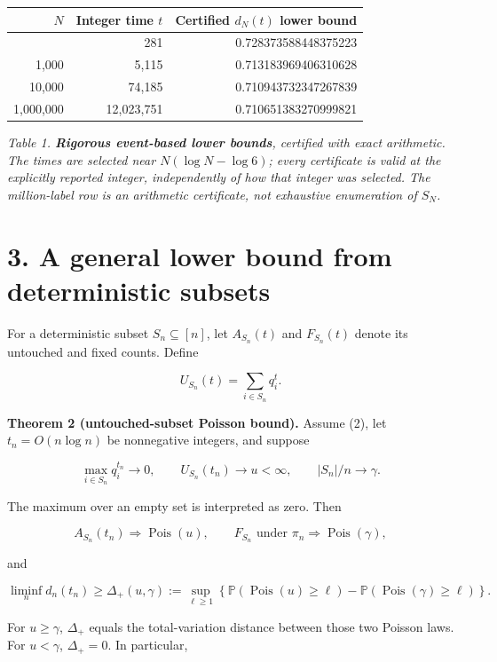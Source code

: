 \documentclass[
  british,
  11pt,
]{article}
\newcounter{none} %
\begin{document}
{\def\LTcaptype{none} %
\begin{longtable}[]{@{}rrr@{}}
\toprule\noalign{}
\(N\) & Integer time \(t\) & Certified \(d_N(t)\) lower bound \\
\midrule\noalign{}
\endhead
\bottomrule\noalign{}
\endlastfoot
100 & 281 & 0.728373588448375223 \\
1,000 & 5,115 & 0.713183969406310628 \\
10,000 & 74,185 & 0.710943732347267839 \\
1,000,000 & 12,023,751 & 0.710651383270999821 \\
\end{longtable}
}

\emph{Table 1. \textbf{Rigorous event-based lower bounds}, certified
with exact arithmetic. The times are selected near \(N(\log N-\log6)\);
every certificate is valid at the explicitly reported integer,
independently of how that integer was selected. The million-label row is
an arithmetic certificate, not exhaustive enumeration of \(S_N\).}

\section{3. A general lower bound from deterministic
subsets}\label{a-general-lower-bound-from-deterministic-subsets}

For a deterministic subset \(S_n\subseteq[n]\), let \(A_{S_n}(t)\) and
\(F_{S_n}(t)\) denote its untouched and fixed counts. Define

\[U_{S_n}(t)=\sum_{i\in S_n}q_i^t.\]

\textbf{Theorem 2 (untouched-subset Poisson bound).} Assume (2), let
\(t_n=O(n\log n)\) be nonnegative integers, and suppose

\[
\max_{i\in S_n}q_i^{t_n}\longrightarrow0,\qquad
U_{S_n}(t_n)\longrightarrow u<\infty,\qquad
|S_n|/n\longrightarrow\gamma.
\]

The maximum over an empty set is interpreted as zero. Then

\[
A_{S_n}(t_n)\Longrightarrow\operatorname{Pois}(u),
\qquad F_{S_n}\text{ under }\pi_n\Longrightarrow\operatorname{Pois}(\gamma), \tag{14}
\]

and

\[
\liminf_n d_n(t_n)\ge
\Delta_+(u,\gamma):=
\sup_{\ell\ge1}\left\{
\mathbb P(\operatorname{Pois}(u)\ge\ell)
-\mathbb P(\operatorname{Pois}(\gamma)\ge\ell)\right\}. \tag{15}
\]

For \(u\ge\gamma\), \(\Delta_+\) equals the total-variation distance
between those two Poisson laws. For \(u<\gamma\), \(\Delta_+=0\). In
particular,
\end{document}
